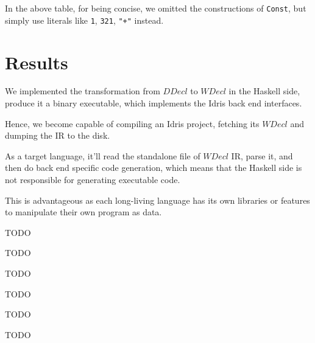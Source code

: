 \documentclass[a1,portrait]{a1poster}
\begin{document}
\begin{multicols}{2}
In the above table, for being concise, we omitted the constructions of \lstinline!Const!,
but simply use literals like \lstinline!1!, \lstinline!321!, \lstinline!"+"! instead.







\color{FireBrick} %

\section*{Results}

We implemented the transformation from $DDecl$ to $WDecl$ in the Haskell side,
produce it a binary executable, which implements the Idris back end interfaces.

Hence, we become capable of compiling an Idris project, fetching its $WDecl$ and
dumping the IR to the disk.

As a target language, it'll read the standalone file of $WDecl$ IR, parse it,
and then do back end specific code generation, which means that the Haskell side
is not responsible for generating executable code.

This is advantageous as
each long-living language has its own libraries or features to manipulate
their own program as data.

TODO

TODO

TODO

TODO

TODO

TODO


\end{multicols}
\end{document}
